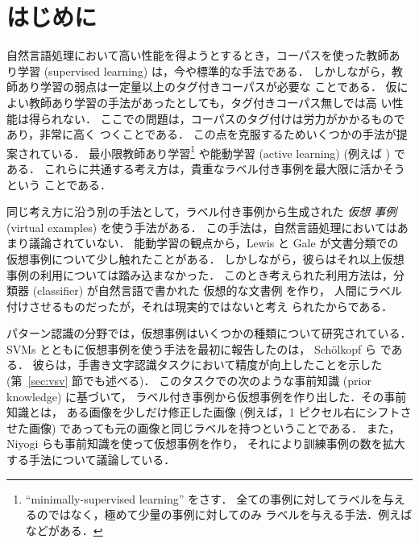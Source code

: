 \maketitle
\thispagestyle{empty}



\section{はじめに}
自然言語処理において高い性能を得ようとするとき，コーパスを使った教師あ
り学習 (supervised learning) は，今や標準的な手法である．
しかしながら，教師あり学習の弱点は一定量以上のタグ付きコーパスが必要な
ことである．
仮によい教師あり学習の手法があったとしても，タグ付きコーパス無しでは高
い性能は得られない．
ここでの問題は，コーパスのタグ付けは労力がかかるものであり，非常に高く
つくことである．
この点を克服するためいくつかの手法が提案されている．
最小限教師あり学習\footnote{
``minimally-supervised learning'' をさす．
全ての事例に対してラベルを与えるのではなく，極めて少量の事例に対してのみ
ラベルを与える手法．例えば
\cite{Yarowsky1995,Yarowsky2000} などがある．
}
や能動学習 (active learning) (例えば \cite{Thompson1999,Sassano2002})
である．
これらに共通する考え方は，貴重なラベル付き事例を最大限に活かそうという
ことである．

同じ考え方に沿う別の手法として，ラベル付き事例から生成された {\em 仮想
事例} (virtual examples) を使う手法がある．
この手法は，自然言語処理においてはあまり議論されていない．
能動学習の観点から，Lewis と Gale  が文書分類での
仮想事例について少し触れたことがある．
しかしながら，彼らはそれ以上仮想事例の利用については踏み込まなかった．
このとき考えられた利用方法は，分類器 (classifier) が自然言語で書かれた
仮想的な文書例
を作り，
人間にラベル付けさせるものだったが，それは現実的ではないと考え
られたからである．

パターン認識の分野では，仮想事例はいくつかの種類について研究されている．
SVMs とともに仮想事例を使う手法を最初に報告したのは，
Sch\"{o}lkopf ら  である．
彼らは，手書き文字認識タスクにおいて精度が向上したことを示した 
(第~\ref{sec:vsv} 節でも述べる)．
このタスクでの次のような事前知識 (prior knowledge) に基づいて，
ラベル付き事例から仮想事例を作り出した．その事前知識とは，
ある画像を少しだけ修正した画像 
(例えば，1 ピクセル右にシフトさせた画像) 
であっても元の画像と同じラベルを持つということである．
また，Niyogi らも事前知識を使って仮想事例を作り，
それにより訓練事例の数を拡大する手法について議論している\cite{Niyogi1998}．

